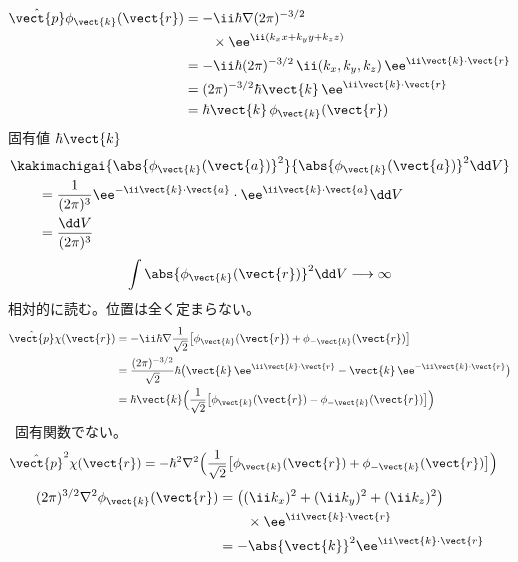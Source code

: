\begin{align*}
\hat{\vect{p}}\phi_{\vect{k}}(\vect{r})&=-\ii\hbar\nabla(2\pi)^{-3/2}\\
&\qquad\times\ee^{\ii(k_{x}x+k_{y}y+k_{z}z)}\\
&=-\ii\hbar(2\pi)^{-3/2}\,\ii(k_{x},k_{y},k_{z})\,\ee^{\ii\vect{k}\cdot\vect{r}}\\
&=(2\pi)^{-3/2}\hbar\vect{k}\,\ee^{\ii\vect{k}\cdot\vect{r}}\\
&=\hbar\vect{k}\,\phi_{\vect{k}}(\vect{r})
\end{align*}
固有値 $\hbar\vect{k}$
\begin{align*}
&\kakimachigai{\abs{\phi_{\vect{k}}(\vect{a})}^{2}}{\abs{\phi_{\vect{k}}(\vect{a})}^{2}\dd V}\\
&\qquad=\frac{1}{(2\pi)^{3}}\ee^{-\ii\vect{k}\cdot\vect{a}}\cdot\ee^{\ii\vect{k}\cdot\vect{a}}\dd V\\
&\qquad=\frac{\dd V}{(2\pi)^{3}}
\end{align*}
\[ \int\abs{\phi_{\vect{k}}(\vect{r})}^{2}\dd V\longrightarrow\infty \]
相対的に読む。位置は全く定まらない。
\begin{align*}
\hat{\vect{p}}\chi(\vect{r})&=-\ii\hbar\nabla\frac{1}{\sqrt{2}}\bigl[\phi_{\vect{k}}(\vect{r})+\phi_{-\vect{k}}(\vect{r})\bigr]\\
&=\frac{(2\pi)^{-3/2}}{\sqrt{2}}\hbar\bigl(\vect{k}\,\ee^{\ii\vect{k}\cdot\vect{r}}-\vect{k}\,\ee^{-\ii\vect{k}\cdot\vect{r}}\bigr)\\
&=\hbar\vect{k}\Bigl(\frac{1}{\sqrt{2}}\bigl[\phi_{\vect{k}}(\vect{r})-\phi_{-\vect{k}}(\vect{r})\bigr]\Bigr)
\end{align*}
\ 固有関数でない。
\begin{align*}
\hat{\vect{p}}^{2}\chi(\vect{r})&=-\hbar^{2}\nabla^{2}\Bigl(\frac{1}{\sqrt{2}}\bigl[\phi_{\vect{k}}(\vect{r})+\phi_{-\vect{k}}(\vect{r})\bigr]\Bigr)
\end{align*}
\begin{align*}
(2\pi)^{3/2}\nabla^{2}\phi_{\vect{k}}(\vect{r})&=\bigl((\ii k_{x})^{2}+(\ii k_{y})^{2}+(\ii k_{z})^{2}\bigr)\\
&\qquad\times\ee^{\ii\vect{k}\cdot\vect{r}}\\
&=-\abs{\vect{k}}^{2}\ee^{\ii\vect{k}\cdot\vect{r}}
\end{align*}
